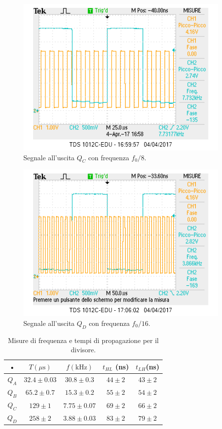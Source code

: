 \documentclass[10pt,a4paper]{article}
\begin{document}
\begin{figure}
\centering
\includegraphics[scale=1.0]{QC1-8.png}
\caption{Segnale all'uscita $Q_C$ con frequenza $f_0/8$.\label{freq8}}
\end{figure}

\begin{figure}
\centering
\includegraphics[scale=1.0]{QD1-16.png}
\caption{Segnale all'uscita $Q_D$ con frequenza $f_0/16$.\label{freq16}}
\end{figure}


\begin{table}[!htb]
\centering
\begin{tabular}{|c|c|c|c|c|}
\hline 
• & $T (\mu \mbox{s})$ & $f (\mbox{kHz})$ & $t_{HL}$ (ns) & $t_{LH}$(ns) \\ 
\hline 
$Q_A$ & $32.4 \pm 0.03$ & $30.8 \pm 0.3$ & $44 \pm 2$ & $43 \pm 2$ \\ 
\hline 
$Q_B$ & $65.2 \pm 0.7$ & $15.3 \pm 0.2$ & $55 \pm 2$ & $54 \pm 2$ \\ 
\hline 
$Q_C$ & $129 \pm 1$ & $7.75 \pm 0.07$ & $69 \pm 2$ & $66 \pm 2$ \\ 
\hline 
$Q_D$ & $258 \pm 2$ & $3.88 \pm 0.03$ & $83 \pm 2$ & $79 \pm 2$ \\ 
\hline 
\end{tabular} 
\caption{Misure di frequenza e tempi di propagazione per il divisore. \label{misureDivisore}}
\end{table}
\end{document}
